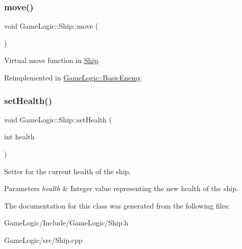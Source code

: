 \subsubsection{\texorpdfstring{move()}{move()}}
{\footnotesize\ttfamily void Game\+Logic\+::\+Ship\+::move (\begin{DoxyParamCaption}{ }\end{DoxyParamCaption})\hspace{0.3cm}{\ttfamily [virtual]}}

Virtual move function in \hyperlink{classGameLogic_1_1Ship}{Ship}. 

Reimplemented in \hyperlink{classGameLogic_1_1BasicEnemy_a8c51b862c94953e5455c04c2227b6d73}{Game\+Logic\+::\+Basic\+Enemy}.

\mbox{\label{classGameLogic_1_1Ship_af0604b26727de4793a03464753ef443e}} 
\subsubsection{\texorpdfstring{set\+Health()}{setHealth()}}
{\footnotesize\ttfamily void Game\+Logic\+::\+Ship\+::set\+Health (\begin{DoxyParamCaption}\item[{int}]{health }\end{DoxyParamCaption})}

Setter for the current health of the ship. 
\begin{DoxyParams}{Parameters}
{\em health} & Integer value representing the new health of the ship. \\
\hline
\end{DoxyParams}


The documentation for this class was generated from the following files\+:\begin{DoxyCompactItemize}
\item 
Game\+Logic/\+Include/\+Game\+Logic/Ship.\+h\item 
Game\+Logic/src/Ship.\+cpp\end{DoxyCompactItemize}
